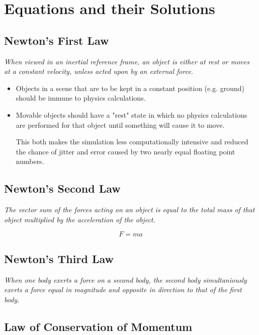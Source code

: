 \documentclass[a4paper]{article}
\begin{document}
\tableofcontents

\section{Equations and their Solutions}

\subsection{Newton's First Law}

\textit{When viewed in an inertial reference frame, an object is either at rest
or moves at a constant velocity, unless acted upon by an external force.}

\begin{itemize}
  \item
    Objects in a scene that are to be kept in a constant position (e.g. ground)
    should be immune to physics calculations.

  \item
    Movable objects should have a "rest" state in which no physics calculations
    are performed for that object until something will cause it to move.

    This both makes the simulation less computationally intensive and reduced
    the chance of jitter and error caused by two nearly equal floating point
    numbers.
\end{itemize}

\subsection{Newton's Second Law}

\textit{The vector sum of the forces acting on an object is equal to the total
mass of that object multiplied by the acceleration of the object.}

\[
  F = ma
\]

\subsection{Newton's Third Law}

\textit{When one body exerts a force on a second body, the second body
simultaniously exerts a force equal in magnitude and opposite in direction to
that of the first body.}

\subsection{Law of Conservation of Momentum}
\end{document}
